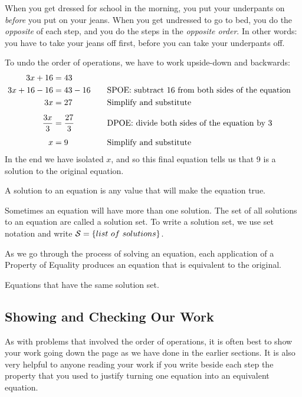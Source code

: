 \begin{boxeddef}
When you get dressed for school in the morning, you put your underpants on \textit{before} you put on your jeans. When you get undressed to go to bed, you do the \textit{opposite} of each step, and you do the steps in the \textit{opposite order}. In other words: you have to take your jeans off first, before you can take your underpants off.
\end{boxeddef}

To undo the order of operations, we have to work upside-down and backwards:
\[\begin{aligned}
3x + 16 & = 43\\
3x + 16 - 16 & = 43 - 16
&&\text{\quad SPOE: subtract 16 from both sides of the equation}\\
3x & = 27
&&\text{\quad Simplify and substitute}\\[1ex]
\frac{3x}{3} & = \frac{27}{3}
&&\text{\quad DPOE: divide both sides of the equation by 3}\\[1ex]
x & = 9
&&\text{\quad Simplify and substitute}\\
\end{aligned}\]
In the end we have isolated $x$, and so this final equation tells us that 9 is a solution to the original equation.

\begin{boxeddef}
A \gls{solution} to an equation is any value that will make the equation true.

Sometimes an equation will have more than one solution. The set of all solutions to an equation are called a \gls{solution set}. To write a solution set, we use set notation and write $\mathcal{S}=\left\{list ~ of ~ solutions\right\}$.
\end{boxeddef}

As we go through the process of solving an equation, each application of a Property of Equality produces an equation that is equivalent to the original.

\begin{boxeddef}
Equations that have the same solution set.
\end{boxeddef}

\subsection{Showing and Checking Our Work}

As with problems that involved the order of operations, it is often best to show your work going down the page as we have done in the earlier sections. It is also very helpful to anyone reading your work if you write beside each step the property that you used to justify turning one equation into an equivalent equation.

